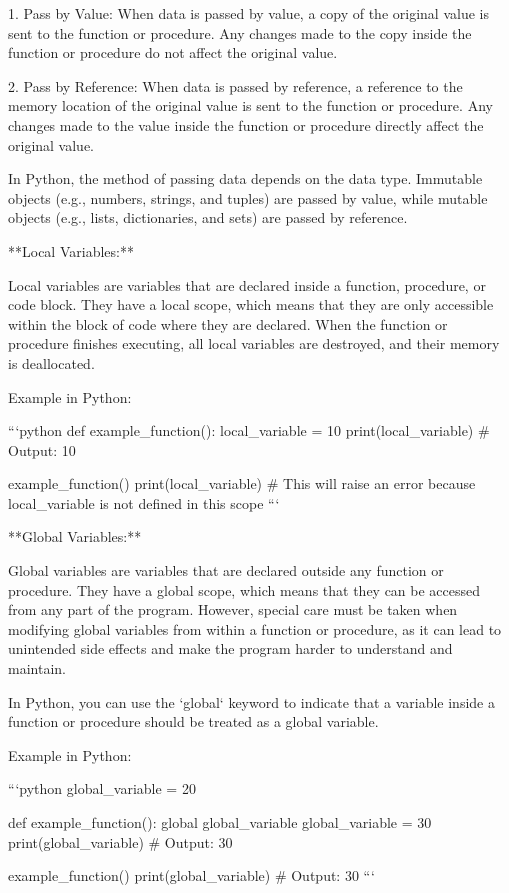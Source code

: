 \documentclass{article}
\begin{document}
1. Pass by Value: When data is passed by value, a copy of the original value is sent to the function or procedure. Any changes made to the copy inside the function or procedure do not affect the original value.

2. Pass by Reference: When data is passed by reference, a reference to the memory location of the original value is sent to the function or procedure. Any changes made to the value inside the function or procedure directly affect the original value.

In Python, the method of passing data depends on the data type. Immutable objects (e.g., numbers, strings, and tuples) are passed by value, while mutable objects (e.g., lists, dictionaries, and sets) are passed by reference.

**Local Variables:**

Local variables are variables that are declared inside a function, procedure, or code block. They have a local scope, which means that they are only accessible within the block of code where they are declared. When the function or procedure finishes executing, all local variables are destroyed, and their memory is deallocated.

Example in Python:

```python
def example_function():
    local_variable = 10
    print(local_variable)  # Output: 10

example_function()
print(local_variable)  # This will raise an error because local_variable is not defined in this scope
```

**Global Variables:**

Global variables are variables that are declared outside any function or procedure. They have a global scope, which means that they can be accessed from any part of the program. However, special care must be taken when modifying global variables from within a function or procedure, as it can lead to unintended side effects and make the program harder to understand and maintain.

In Python, you can use the `global` keyword to indicate that a variable inside a function or procedure should be treated as a global variable.

Example in Python:

```python
global_variable = 20

def example_function():
    global global_variable
    global_variable = 30
    print(global_variable)  # Output: 30

example_function()
print(global_variable)  # Output: 30
```
\end{document}
